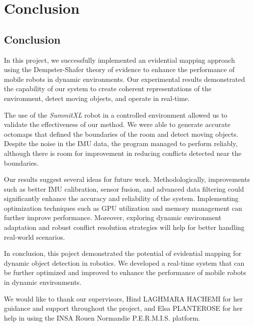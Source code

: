 \chapter{Conclusion}

\section*{Conclusion}

In this project, we successfully implemented an evidential mapping approach using the Dempster-Shafer theory of evidence to enhance the performance of mobile robots in dynamic environments.
Our experimental results demonstrated the capability of our system to create coherent representations of the environment, detect moving objects, and operate in real-time.

The use of the \textit{SummitXL} robot in a controlled environment allowed us to validate the effectiveness of our method.
We were able to generate accurate octomaps that defined the boundaries of the room and detect moving objects.
Despite the noise in the IMU data, the program managed to perform reliably, although there is room for improvement in reducing conflicts detected near the boundaries.

Our results suggest several ideas for future work.
Methodologically, improvements such as better IMU calibration, sensor fusion, and advanced data filtering could significantly enhance the accuracy and reliability of the system.
Implementing optimization techniques such as GPU utilization and memory management can further improve performance.
Moreover, exploring dynamic environment adaptation and robust conflict resolution strategies will help for better handling real-world scenarios.

In conclusion, this poject demonstrated the potential of evidential mapping for dynamic object detection in robotics.
We developed a real-time system that can be further optimized and improved to enhance the performance of mobile robots in dynamic environments.

We would like to thank our supervisors, Hind LAGHMARA HACHEMI for her guidance and support throughout the project, and Elsa PLANTEROSE for her help in using the INSA Rouen Normandie P.E.R.M.I.S. platform.